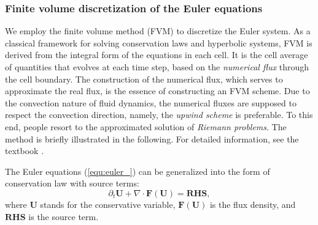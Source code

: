 \documentclass{article}
\begin{document}
\subsubsection{Finite volume discretization of the Euler equations}
We employ the finite volume method (FVM) to discretize the Euler system. As a classical framework for solving conservation laws and hyperbolic systems, FVM is derived from the integral form of the equations in each cell. It is the cell average of quantities that evolves at each time step, based on the \emph{numerical flux} through the cell boundary. The construction of the numerical flux, which serves to approximate the real flux, is the essence of constructing an FVM scheme. Due to the convection nature of fluid dynamics, the numerical fluxes are supposed to respect the convection direction, namely, the \emph{upwind scheme} is preferable. To this end, people resort to the approximated solution of \emph{Riemann problems}. The method is briefly illustrated in the following. For detailed information, see the textbook \cite{leveque_2002}.

The Euler equations (\ref{equ:euler_}) can be generalized into the form of conservation law with source terms:
\begin{equation} \label{equ:euler_conservation}
    \partial_t \mathbf{U} + \nabla \cdot \mathbf{F}(\mathbf{U}) = \mathbf{RHS},
\end{equation}
where $\mathbf{U}$ stands for the conservative variable, $\mathbf{F}(\mathbf{U})$ is the flux density, and $\mathbf{RHS}$ is the source term. 
\end{document}
